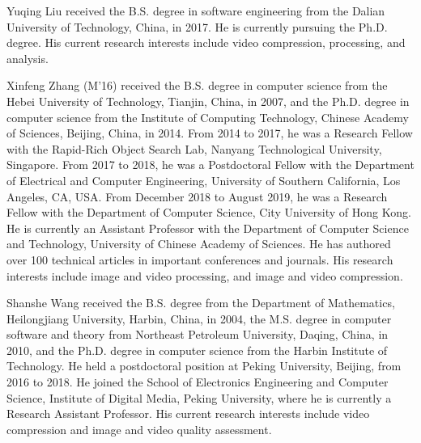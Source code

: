 \documentclass[journal]{IEEEtran}
\begin{document}
\begin{IEEEbiography}{Yuqing Liu}
received the B.S. degree in software engineering from the Dalian University of Technology, China, in 2017. He is currently pursuing the Ph.D. degree. His current research interests include video compression, processing, and analysis.
\end{IEEEbiography}
\begin{IEEEbiography}{Xinfeng Zhang}
(M’16) received the B.S. degree in computer science from the Hebei University of Technology, Tianjin, China, in 2007, and the Ph.D. degree in computer science from the Institute of Computing Technology, Chinese Academy of Sciences, Beijing, China, in 2014. From 2014 to 2017, he was a Research Fellow with the Rapid-Rich Object Search Lab, Nanyang Technological University, Singapore. From 2017 to 2018, he was a Postdoctoral Fellow with the Department of Electrical and Computer Engineering, University of Southern California, Los Angeles, CA, USA. From December 2018 to August 2019, he was a Research Fellow with the Department of Computer Science, City University of Hong Kong. He is currently an Assistant Professor with the Department of Computer Science and Technology, University of Chinese Academy of Sciences. He has authored over 100 technical articles in important conferences and journals. His research interests include image and video processing, and image and video compression.
\end{IEEEbiography}
\begin{IEEEbiography}{Shanshe Wang}
received the B.S. degree from the Department of Mathematics, Heilongjiang University, Harbin, China, in 2004, the M.S. degree in computer software and theory from Northeast Petroleum University, Daqing, China, in 2010, and the Ph.D. degree in computer science from the Harbin Institute of Technology. He held a postdoctoral position at Peking University, Beijing, from 2016 to 2018. He joined the School of Electronics Engineering and Computer Science, Institute of Digital Media, Peking University, where he is currently a Research Assistant Professor. His current research interests include video compression and image and video quality assessment.
\end{IEEEbiography}
\end{document}
